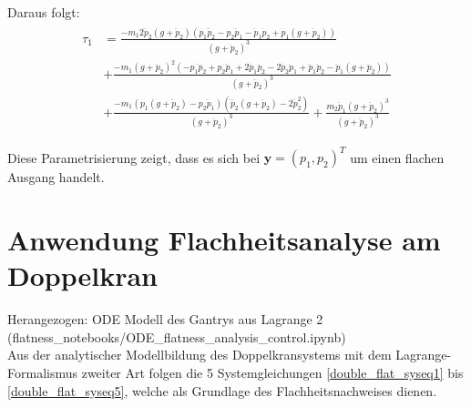 Daraus folgt:
\begin{align}
	\begin{split}
	\tau_1 &=
	\frac{- m_{1} 2 \dddot{p}_{2} \left(g + \ddot{p}_{2}\right) \left(p_{1} \dddot{p}_{2} - p_{2} \dddot{p}_{1} - \ddot{p}_{1} \dot{p}_{2} + \dot{p}_{1} \left(g + \ddot{p}_{2}\right)\right)}{\left(g + \ddot{p}_{2}\right)^{3}} \\	
	&+ \frac{- m_{1} \left(g + \ddot{p}_{2}\right)^{2} \left(- p_{1} \ddddot{p}_{2} + p_{2} \ddddot{p}_{1} + 2 \dddot{p}_{1} \dot{p}_{2} - 2 \dddot{p}_{2} \dot{p}_{1} + \ddot{p}_{1} \ddot{p}_{2} - \ddot{p}_{1} \left(g + \ddot{p}_{2}\right)\right)}{\left(g + \ddot{p}_{2}\right)^{3}} \\
	&+ \frac{-m_1 \left(p_{1} \left(g + \ddot{p}_{2}\right) - p_{2} \ddot{p}_{1}\right) \left(\ddddot{p}_{2} \left(g + \ddot{p}_{2}\right) - 2 \dddot{p}_{2}^{2}\right)}{\left(g + \ddot{p}_{2}\right)^{3}} + \frac{m_{2} \ddot{p}_{1} \left(g + \ddot{p}_{2}\right)^{3}}{\left(g + \ddot{p}_{2}\right)^{3}}
	\end{split}
\end{align}

Diese Parametrisierung zeigt, dass es sich bei $\mathbf{y} = (p_1, p_2)^T$ um einen flachen Ausgang handelt.

\section{Anwendung Flachheitsanalyse am Doppelkran}

Herangezogen: ODE Modell des Gantrys aus Lagrange 2 \\ (flatness\_notebooks/ODE\_flatness\_analysis\_control.ipynb) \\
Aus der analytischer Modellbildung des Doppelkransystems mit dem Lagrange-Formalismus zweiter Art folgen die 5 Systemgleichungen \ref{double_flat_syseq1} bis \ref{double_flat_syseq5}, welche als Grundlage des Flachheitsnachweises dienen. 

